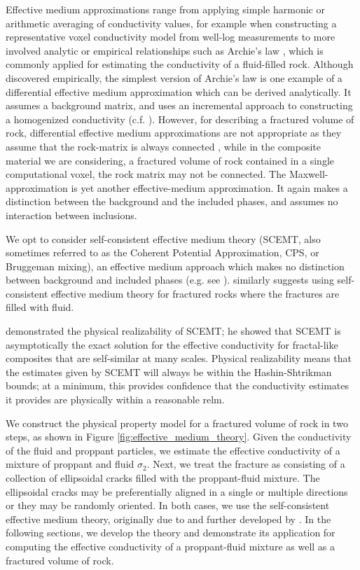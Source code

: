 Effective medium approximations range from applying simple harmonic or arithmetic averaging of conductivity values, for example when constructing a representative voxel conductivity model from well-log measurements to more involved analytic or empirical relationships such as Archie’s law \citep{Archie1942}, which is commonly applied for estimating the conductivity of a fluid-filled rock. Although discovered empirically, the simplest version of Archie’s law is one example of a differential effective medium approximation which can be derived analytically. It assumes a background matrix, and uses an incremental approach to constructing a homogenized conductivity (c.f. \cite{Torquato2002, Milton2002}). However, for describing a fractured volume of rock, differential effective medium approximations are not appropriate as they assume that the rock-matrix is always connected \cite{Torquato2002}, while in the composite material we are considering, a fractured volume of rock contained in a single computational voxel, the rock matrix may not be connected. The Maxwell-approximation is yet another effective-medium approximation. It again makes a distinction between the background and the included phases, and assumes no interaction between inclusions.

We opt to consider self-consistent effective medium theory (SCEMT, also sometimes referred to as the Coherent Potential Approximation, CPS, or Bruggeman mixing), an effective medium approach which makes no distinction between background and included phases (e.g. see \cite{Torquato2002}). \cite{Berryman2013} similarly suggests using self-consistent effective medium theory for fractured rocks where the fractures are filled with fluid.

\cite{Milton1985} demonstrated the physical realizability of SCEMT; he showed that SCEMT is asymptotically the exact solution for the effective conductivity for fractal-like composites that are self-similar at many scales. Physical realizability means that the estimates given by SCEMT will always be within the Hashin-Shtrikman bounds; at a minimum, this provides confidence that the conductivity estimates it provides are physically within a reasonable relm.

We construct the physical property model for a fractured volume of rock in two steps, as shown in Figure \ref{fig:effective_medium_theory}. Given the conductivity of the fluid and proppant particles, we estimate the effective conductivity of a mixture of proppant and fluid $\sigma_2$. Next, we treat the fracture as consisting of a collection of ellipsoidal cracks filled with the proppant-fluid mixture. The ellipsoidal cracks may be preferentially aligned in a single or multiple directions or they may be randomly oriented. In both cases, we use the self-consistent effective medium theory, originally due to \cite{Bruggeman1935} and further developed by \cite{Landauer1952, Landauer1978}. In the following sections, we develop the theory and demonstrate its application for computing the effective conductivity of a proppant-fluid mixture as well as a fractured volume of rock.


